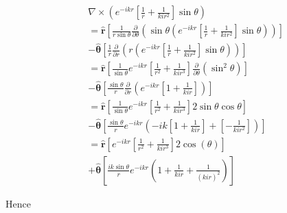 \documentclass[a4paper,11pt]{report}
\begin{document}
\begin{eqnarray}
&&\nabla \times \left( e^{-ikr } \left[  \frac{ 1}{ r}+ \frac{1}{kir^2}\right] \sin \theta \right)\nonumber \\
&&=\mathbf{\hat{r} }\left[ \frac{1}{r \sin \theta} \frac{\partial }{\partial \theta } \left( \sin \theta \left( e^{-ikr } \left[  \frac{ 1}{ r} +\frac{1}{kir^2}\right] \sin \theta \right) \right) \right] \nonumber \\
&&-\mathbf{ \hat{\theta}} \left[ \frac{1}{r} \frac{\partial }{\partial r } \left( r \left( e^{-ikr } \left[  \frac{ 1}{ r}+ \frac{1}{kir^2}\right] \sin \theta \right) \right) \right]\nonumber \\
&&=\mathbf{\hat{r}} \left[ \frac{1}{ \sin \theta} e^{-ikr } \left[  \frac{ 1}{ r^2} +\frac{1}{kir^3}\right] \frac{\partial }{\partial \theta } \left( \sin^2 \theta     \right) \right] \nonumber \\
&&-\mathbf{ \hat{\theta}} \left[ \frac{\sin \theta}{r} \frac{\partial }{\partial r } \left(   e^{-ikr } \left[  1 + \frac{1}{kir}\right]  \right) \right]\nonumber\\
&&=\mathbf{\hat{r}} \left[ \frac{1}{ \sin \theta} e^{-ikr } \left[  \frac{ 1}{ r^2} +\frac{1}{kir^3}\right]  2 \sin \theta \cos \theta     \right] \nonumber \\
&&- \mathbf{\hat{\theta}} \left[ \frac{\sin \theta}{r}  e^{-ikr } \left(  -ik   \left[  1 + \frac{1}{kir}\right]+   \left[ - \frac{1}{kir^2}\right] \right) \right] \nonumber \\
&&=\mathbf{\hat{r} }\left[ e^{-ikr } \left[  \frac{ 1}{ r^2} +\frac{1}{kir^3}\right]   2  \cos (\theta )   \right] \nonumber \\
&&+\mathbf{ \hat{\theta}} \left[ \frac{ik \sin \theta}{r}  e^{-ikr } \left( 1 + \frac{1}{kir}+  \frac{1}{(kir)^2} \right) \right]
\end{eqnarray}

Hence
\end{document}
